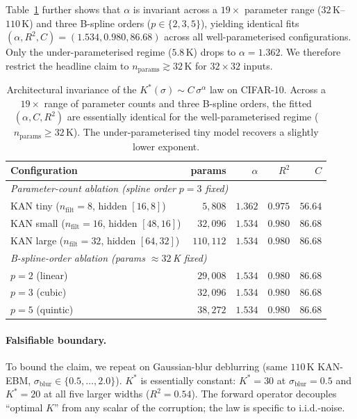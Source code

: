 \documentclass{article}
\begin{document}
Table~\ref{tab:kstar_invariance} further shows that $\alpha$ is invariant across a
$19\times$ parameter range ($32$\,K--$110$\,K) and three B-spline orders ($p{\in}\{2,3,5\}$),
yielding identical fits $(\alpha, R^{2}, C){=}(1.534, 0.980, 86.68)$ across all
well-parameterised configurations. Only the under-parameterised regime ($5.8$\,K) drops
to $\alpha{=}1.362$. We therefore restrict the headline claim to
$n_{\text{params}}{\gtrsim}32$\,K for $32{\times}32$ inputs.

\begin{table}[t]
\centering\small
\begin{tabular}{lrrrr}
\toprule
Configuration & params & $\alpha$ & $R^{2}$ & $C$ \\
\midrule
\multicolumn{5}{l}{\emph{Parameter-count ablation (spline order $p{=}3$ fixed)}} \\
KAN tiny  ($n_{\text{filt}}{=}8$, hidden $[16,8]$)    & $5{,}808$   & $1.362$ & $0.975$ & $56.64$ \\
KAN small ($n_{\text{filt}}{=}16$, hidden $[48,16]$)  & $32{,}096$  & $1.534$ & $0.980$ & $86.68$ \\
KAN large ($n_{\text{filt}}{=}32$, hidden $[64,32]$)  & $110{,}112$ & $1.534$ & $0.980$ & $86.68$ \\
\midrule
\multicolumn{5}{l}{\emph{B-spline-order ablation (params $\approx 32$\,K fixed)}} \\
$p{=}2$ (linear)    & $29{,}008$ & $1.534$ & $0.980$ & $86.68$ \\
$p{=}3$ (cubic)     & $32{,}096$ & $1.534$ & $0.980$ & $86.68$ \\
$p{=}5$ (quintic)   & $38{,}272$ & $1.534$ & $0.980$ & $86.68$ \\
\bottomrule
\end{tabular}
\caption{Architectural invariance of the $K^{*}(\sigma){\sim}C\,\sigma^{\alpha}$
law on CIFAR-10. Across a $19\times$ range of parameter counts and three
B-spline orders, the fitted $(\alpha, C, R^{2})$ are essentially identical for
the well-parameterised regime ($n_{\text{params}}{\geq}32$\,K). The
under-parameterised tiny model recovers a slightly lower exponent.}
\label{tab:kstar_invariance}
\end{table}

\paragraph{Falsifiable boundary.}
\label{sec:kstar-deblur}

To bound the claim, we repeat on Gaussian-blur deblurring (same $110$\,K KAN-EBM,
$\sigma_{\text{blur}}{\in}\{0.5,\ldots,2.0\}$). $K^{*}$ is essentially constant:
$K^{*}{=}30$ at $\sigma_{\text{blur}}{=}0.5$ and $K^{*}{=}20$ at all five larger widths
($R^{2}{=}0.54$). The forward operator decouples ``optimal $K$'' from any scalar
of the corruption; the law is specific to i.i.d.-noise.
\end{document}
